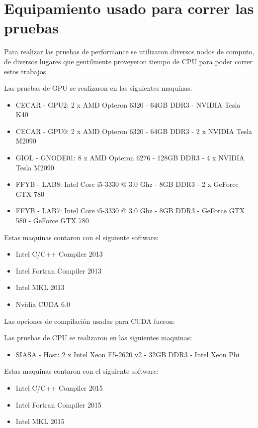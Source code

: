 \chapter{Equipamiento usado para correr las pruebas}
\label{testbench}

Para realizar las pruebas de performance se utilizaron diversos nodos de computo, de diversos lugares que
gentilmente proveyeron tiempo de CPU para poder correr estos trabajos

Las pruebas de GPU se realizaron en las siguientes maquinas.
\begin{itemize}
  \item CECAR - GPU2: 2 x AMD Opteron 6320 - 64GB DDR3 - NVIDIA Tesla K40
  \item CECAR - GPU0: 2 x AMD Opteron 6320 - 64GB DDR3 - 2 x NVIDIA Tesla M2090
  \item GIOL - GNODE01: 8 x AMD Opteron 6276 - 128GB DDR3 - 4 x NVIDIA Tesla M2090
  \item FFYB - LAB8: Intel Core i5-3330 @ 3.0 Ghz - 8GB DDR3 - 2 x GeForce GTX 780
  \item FFYB - LAB7: Intel Core i5-3330 @ 3.0 Ghz - 8GB DDR3 - GeForce GTX 580 - GeForce GTX 780
\end{itemize}

Estas maquinas contaron con el siguiente software:
\begin{itemize}
  \item Intel C/C++ Compiler 2013
  \item Intel Fortran Compiler 2013
  \item Intel MKL 2013
  \item Nvidia CUDA 6.0
\end{itemize}

Las opciones de compilaci\'on usadas para CUDA fueron:
\textit{}

Las pruebas de CPU se realizaron en las siguientes maquinas:
\begin{itemize}
  \item SIASA - Host: 2 x Intel Xeon E5-2620 v2 - 32GB DDR3 - Intel Xeon Phi
\end{itemize}

Estas maquinas contaron con el siguiente software:
\begin{itemize}
  \item Intel C/C++ Compiler 2015
  \item Intel Fortran Compiler 2015
  \item Intel MKL 2015
\end{itemize}

